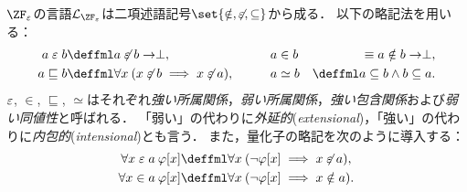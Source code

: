 \documentclass[realisability.tex]{subfiles}
\begin{document}
\begin{definition}[理論$\ZF_{\varepsilon}$]
 $\ZF_{\varepsilon}$の言語$\mathcal{L}_{\ZF_{\varepsilon}}$は二項述語記号$\set{{\notin}, {\strnin}, {\subseteq}}$から成る．
 以下の略記法を用いる：
 \begin{alignat*}{3}
  a \strin b &\deffml a \strnin b \to \perp, &\qquad&
  a \in b &\equiv a \notin b \to \perp,\\
  a \sqsubseteq b &\deffml \forall x \: (x \strnin b \implies x \strnin a),&&
  a \simeq b & \deffml a \subseteq b \wedge b \subseteq a.
 \end{alignat*}
 $\mathrel{\varepsilon}$, $\in$, $\sqsubseteq$, $\simeq$はそれぞれ\emph{強い所属関係}，\emph{弱い所属関係}，\emph{強い包含関係}および\emph{弱い同値性}と呼ばれる．
 「弱い」の代わりに\emph{外延的}(\emph{extensional})，「強い」の代わりに\emph{内包的}(\emph{intensional})とも言う．
 また，量化子の略記を次のように導入する：
 \begin{align*}
  \forall x \strin a \: \varphi[x] &\deffml \forall x \: (\neg \varphi[x] \implies x \strnin a),\\
  \forall x \in a \: \varphi[x] &\deffml \forall x \: (\neg \varphi[x] \implies x \notin a).
 \end{align*}



\end{definition}
\end{document}

